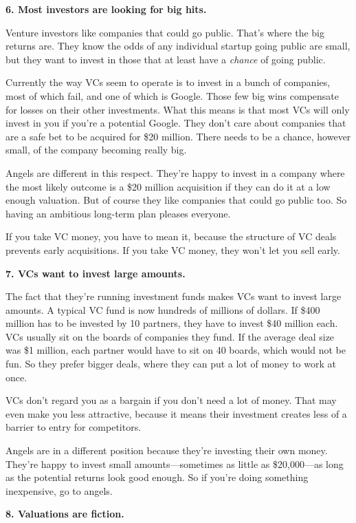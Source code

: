 \textbf{6. Most investors are looking for big hits.}

Venture investors like companies that could go public. That's where the
big returns are. They know the odds of any individual startup going
public are small, but they want to invest in those that at least have a
\emph{chance} of going public.

Currently the way VCs seem to operate is to invest in a bunch of
companies, most of which fail, and one of which is Google. Those few big
wins compensate for losses on their other investments. What this means
is that most VCs will only invest in you if you're a potential Google.
They don't care about companies that are a safe bet to be acquired for
\$20 million. There needs to be a chance, however small, of the company
becoming really big.

Angels are different in this respect. They're happy to invest in a
company where the most likely outcome is a \$20 million acquisition if
they can do it at a low enough valuation. But of course they like
companies that could go public too. So having an ambitious long-term
plan pleases everyone.

If you take VC money, you have to mean it, because the structure of VC
deals prevents early acquisitions. If you take VC money, they won't let
you sell early.

\textbf{7. VCs want to invest large amounts.}

The fact that they're running investment funds makes VCs want to invest
large amounts. A typical VC fund is now hundreds of millions of dollars.
If \$400 million has to be invested by 10 partners, they have to invest
\$40 million each. VCs usually sit on the boards of companies they fund.
If the average deal size was \$1 million, each partner would have to sit
on 40 boards, which would not be fun. So they prefer bigger deals, where
they can put a lot of money to work at once.

VCs don't regard you as a bargain if you don't need a lot of money. That
may even make you less attractive, because it means their investment
creates less of a barrier to entry for competitors.

Angels are in a different position because they're investing their own
money. They're happy to invest small amounts---sometimes as little as
\$20,000---as long as the potential returns look good enough. So if
you're doing something inexpensive, go to angels.

\textbf{8. Valuations are fiction.}

